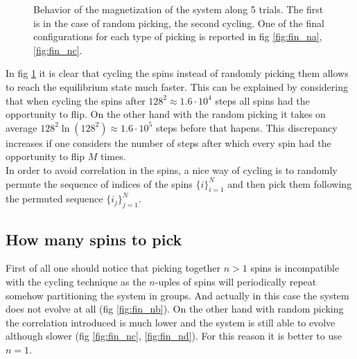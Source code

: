 \documentclass[a4paper, 11pt]{article}
\begin{document}
      \begin{figure}[H]
        \centering
         \quad
        \caption{Behavior of the magnetization of the system along 5 trials. The first is in the case of random picking, the second cycling. One of the final configurations for each type of picking is reported in fig \ref{fig:fin_na}, \ref{fig:fin_nc}.}
        \label{fig:pick_m}
      \end{figure}

      In fig \ref{fig:pick_m} it is clear that cycling the spins instead of randomly picking them allows to reach the equilibrium state much faster. This can be explained by considering that when cycling the spins after $128^2 \approx 1.6\cdot10^4$ steps all spins had the opportunity to flip. On the other hand with the random picking it takes on average $128^2 \ln (128^2) \approx 1.6\cdot10^5$ steps before that hapens. This discrepancy increases if one considers the number of steps after which every spin had the opportunity to flip $M$ times.\\
      In order to avoid correlation in the spins, a nice way of cycling is to randomly permute the sequence of indices of the spins $\{i\}_{i=1}^N$ and then pick them following the permuted sequence $\{i_j\}_{j=1}^N$.

    \subsection{How many spins to pick}
      First of all one should notice that picking together $n > 1$ spins is incompatible with the cycling technique as the $n$-uples of spins will periodically repeat somehow partitioning the system in groups. And actually in this case the system does not evolve at all (fig \ref{fig:fin_nb}).
      On the other hand with random picking the correlation introduced is much lower and the system is still able to evolve although slower (fig \ref{fig:fin_nc}, \ref{fig:fin_nd}). For this reason it is better to use $n = 1$.
\end{document}
